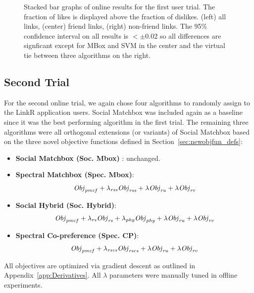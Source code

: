 \begin{figure}[t!]
\caption{Stacked bar graphs of online results for the first 
user trial.  The fraction of likes is displayed above 
the fraction of dislikes.  (left) all links, (center) friend links,
(right) non-friend links.  The 95\% confidence interval on all 
results is $< \pm 0.02$ so all differences are signficant
except for MBox and SVM in the center and the virtual tie
between three algorithms on the right.}
\label{fig:OnlineResult1}
\end{figure}


\subsection{Second Trial}

For the second online trial, we again chose four algorithms to
randomly assign to the LinkR application users.  Social Matchbox
was included again as a baseline since it was the best performing
algorithm in the first trial.  The remaining three algorithms
were all orthogonal extensions (or variants) of Social Matchbox
based on the three novel objective functions defined in 
Section~\ref{sec:newobjfun_defs}:
\begin{itemize}
\item {\bf Social Matchbox (Soc. Mbox)} : unchanged.
\item {\bf Spectral Matchbox (Spec. Mbox)}: 
$$\mathit{Obj}_{\mathit{pmcf}} + \lambda_{\mathit{rss}} \mathit{Obj}_{\mathit{rss}} + \lambda \mathit{Obj}_{\mathit{ru}} + \lambda \mathit{Obj}_{\mathit{rv}}$$
\item {\bf Social Hybrid (Soc. Hybrid)}: 
$$\mathit{Obj}_{\mathit{pmcf}} + \lambda_{\mathit{rs}} \mathit{Obj}_{\mathit{rs}} + \lambda_{\mathit{phy}} \mathit{Obj}_{\mathit{phy}} + \lambda \mathit{Obj}_{\mathit{ru}} + \lambda \mathit{Obj}_{\mathit{rv}}$$
\item {\bf Spectral Co-preference (Spec. CP)}: 
$$\mathit{Obj}_{\mathit{pmcf}} + \lambda_{\mathit{rscs}} \mathit{Obj}_{\mathit{rscs}} + \lambda \mathit{Obj}_{\mathit{ru}} + \lambda \mathit{Obj}_{\mathit{rv}}$$
\end{itemize}
All objectives are optimized via gradient descent as outlined
in Appendix~\ref{app:Derivatives}.  
All $\lambda$ parameters were manually tuned in offline experiments.

